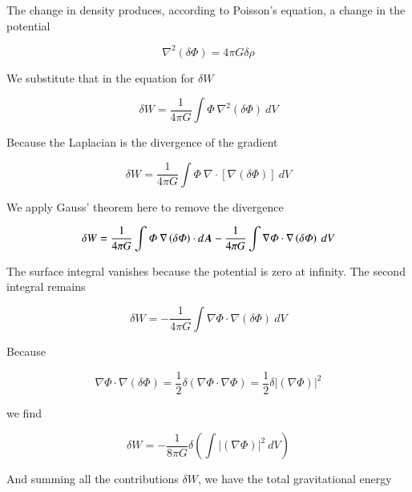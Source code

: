 The change in density produces, according to Poisson's equation, a change in the potential 

\begin{equation}
\nabla^2 \left(\delta \varPhi\right)  =  4\pi G \delta \rho 
\end{equation}


We substitute that in the equation for $\delta W$ 


\begin{equation}
\delta W =  \frac{1}{4\pi G}\int \varPhi \ \nabla^2 \left(\delta \varPhi\right) \ dV
\end{equation}

Because the Laplacian is the divergence of the gradient 


\begin{equation}
\delta W =  \frac{1}{4\pi G}\int \varPhi \ \nabla \cdot \left[ \nabla \left( \delta \varPhi\right)\right] \ dV
\end{equation}

We apply Gauss' theorem here to remove the divergence 

\begin{equation}
\delta W =  \frac{1}{4\pi G}\int \varPhi \ \nabla \left( \delta \varPhi\right) \cdot d\v{A} - \frac{1}{4\pi G}\int \nabla \varPhi \cdot \nabla \left( \delta \varPhi\right) \ dV
\end{equation}

The surface integral vanishes because the potential is zero at infinity. The second integral remains 


\begin{equation}
\delta W =  - \frac{1}{4\pi G}\int \nabla \varPhi \cdot \nabla \left( \delta \varPhi\right) \ dV
\end{equation}

Because 

\begin{equation}
\nabla \varPhi \cdot \nabla \left( \delta \varPhi\right) = \frac{1}{2}\delta \left(\nabla \varPhi \cdot \nabla \varPhi \right) = \frac{1}{2}\delta \vert \left(\nabla \varPhi \right) \vert^2
\end{equation}

we find 

\begin{equation}
\delta W =  - \frac{1}{8\pi G}\delta \left(\int \vert \left(\nabla \varPhi \right) \vert^2 \ dV \right)
\end{equation}

And summing all the contributions $\delta W$, we have the total gravitational energy 

